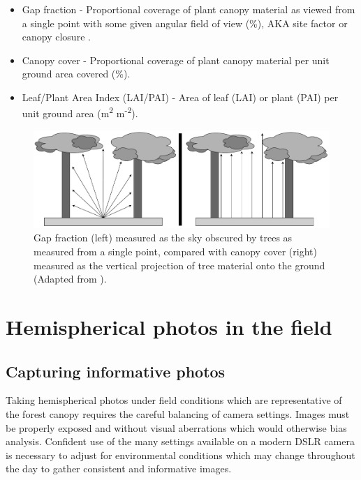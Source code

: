 \documentclass[11pt,a4paper]{article}
\begin{document}
\begin{itemize}
	\item{Gap fraction - Proportional coverage of plant canopy material as viewed from a single point with some given angular field of view (\%), AKA site factor or canopy closure \citep{Anderson1964}.}
	\item{Canopy cover - Proportional coverage of plant canopy material per unit ground area covered (\%).}
	\item{Leaf/Plant Area Index (LAI/PAI) - Area of leaf (LAI) or plant (PAI) per unit ground area (m\textsuperscript{2} m\textsuperscript{-2}).}
\end{itemize}

\begin{figure}[H]
\centering
	\includegraphics[width=\textwidth]{closure.drawio.pdf}
	\caption{Gap fraction (left) measured as the sky obscured by trees as measured from a single point, compared with canopy cover (right) measured as the vertical projection of tree material onto the ground (Adapted from \citealt{Jennings1999}).}
	\label{closure}
\end{figure}

\section{Hemispherical photos in the field}

\subsection{Capturing informative photos}

Taking hemispherical photos under field conditions which are representative of the forest canopy requires the careful balancing of camera settings. Images must be properly exposed and without visual aberrations which would otherwise bias analysis. Confident use of the many settings available on a modern DSLR camera is necessary to adjust for environmental conditions which may change throughout the day to gather consistent and informative images.
\end{document}
